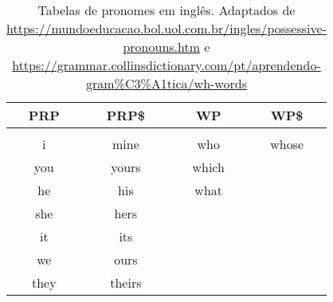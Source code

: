 \begin{table}[]
    \centering
    \begin{tabular}{|c|c|c|c|}
        \hline
        PRP & PRP\$ & WP & WP\$\\
        \hline&&&\\
        i  & mine  & who & whose\\
        you & yours & which & \\
        he & his & what & \\
        she & hers &  & \\
        it  & its &  & \\
        we & ours &  & \\
        they & theirs &  & \\
        \hline
    \end{tabular}
    \caption{Tabelas de pronomes em inglês. Adaptados de \url{https://mundoeducacao.bol.uol.com.br/ingles/possessive-pronouns.htm} e \url{https://grammar.collinsdictionary.com/pt/aprendendo-gram\%C3\%A1tica/wh-words} }
    \label{tab:pron_ingles}
\end{table}